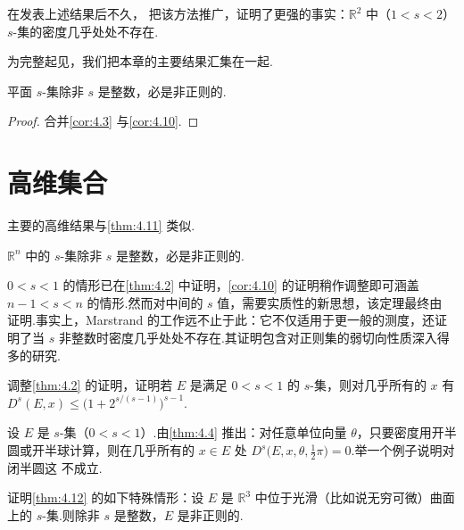 在发表上述结果后不久，\textcite{marstrand1955} 把该方法推广，证明了更强的事实：$\mathbb{R}^2$ 中（$1<s<2$）$s$-集的密度几乎处处不存在.

为完整起见，我们把本章的主要结果汇集在一起.

\begin{theorem}\label{thm:4.11}
平面 $s$-集除非 $s$ 是整数，必是非正则的.
\end{theorem}

\begin{proof}
合并\cref{cor:4.3} 与\cref{cor:4.10}.
\end{proof}

\section{高维集合}

主要的高维结果与\cref{thm:4.11} 类似.

\begin{theorem}\label{thm:4.12}
$\mathbb{R}^n$ 中的 $s$-集除非 $s$ 是整数，必是非正则的.
\end{theorem}

$0<s<1$ 的情形已在\cref{thm:4.2} 中证明，\cref{cor:4.10} 的证明稍作调整即可涵盖 $n-1<s<n$ 的情形.然而对中间的 $s$ 值，需要实质性的新思想，该定理最终由 \textcite{marstrand1964} 证明.事实上，Marstrand 的工作远不止于此：它不仅适用于更一般的测度，还证明了当 $s$ 非整数时密度几乎处处不存在.其证明包含对正则集的弱切向性质深入得多的研究.

\begin{exercises}
\item 调整\cref{thm:4.2} 的证明，证明若 $E$ 是满足 $0<s<1$ 的 $s$-集，则对几乎所有的 $x$ 有 $D^s(E,x)\leq\bigl(1+2^{s/(s-1)}\bigr)^{s-1}$.
\item 设 $E$ 是 $s$-集（$0<s<1$）.由\cref{thm:4.4} 推出：对任意单位向量 $\theta$，只要密度用开半圆或开半球计算，则在几乎所有的 $x\in E$ 处 $D^s\bigl(E,x,\theta,\frac{1}{2}\pi\bigr)=0$.举一个例子说明对闭半圆这 不成立.
\item 证明\cref{thm:4.12} 的如下特殊情形：设 $E$ 是 $\mathbb{R}^3$ 中位于光滑（比如说无穷可微）曲面上的 $s$-集.则除非 $s$ 是整数，$E$ 是非正则的.
\end{exercises}
